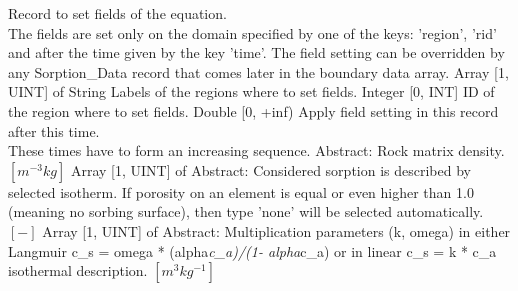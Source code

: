 \begin{RecordType}
	{}
	{} %
	{} %
	{} %
	{{{Record to set fields of the equation.}\\{
The fields are set only on the domain specified by one of the keys: 'region', 'rid'}\\{
and after the time given by the key 'time'. The field setting can be overridden by}\\{
 any Sorption{\_}Data record that comes later in the boundary data array.}}}
		\KeyItem
			{}
			{{Array [1, UINT] of }{String}}
			{\textrangle}
			{} %
			{{{Labels of the regions where to set fields. }}}
		\KeyItem
			{}
			{{Integer [0, INT]}}
			{\textrangle}
			{} %
			{{{ID of the region where to set fields.}}}
		\KeyItem
			{}
			{{Double [0, +inf)}}
			{\textrangle}
			{} %
			{{{Apply field setting in this record after this time.}\\{
These times have to form an increasing sequence.}}}
		\KeyItem
			{}
			{{Abstract}{: }}
			{\textrangle}
			{} %
			{{{Rock matrix density. }{$[m^{-3}kg]$}}}
		\KeyItem
			{}
			{{Array [1, UINT] of }{Abstract}{: }}
			{\textrangle}
			{} %
			{{{Considered sorption is described by selected isotherm. If porosity on an element is equal or even higher than 1.0 (meaning no sorbing surface), then type 'none' will be selected automatically. }{$[-]$}}}
		\KeyItem
			{}
			{{Array [1, UINT] of }{Abstract}{: }}
			{\textrangle}
			{} %
			{{{Multiplication parameters (k, omega) in either Langmuir c{\_}s = omega * (alpha}\textit{c{\_}a)/(1- alpha}{c{\_}a) or in linear c{\_}s = k * c{\_}a isothermal description. }{$[m^{3}kg^{-1}]$}}}

\end{RecordType}
